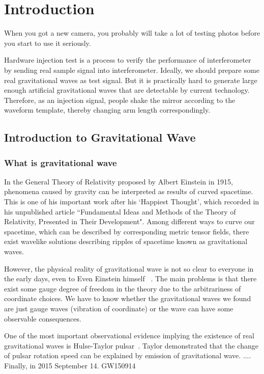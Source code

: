 \chapter{Introduction} 

When you got a new camera, you probably will take a lot of testing photos before you start to use it seriously. 

Hardware injection test is a process to verify the performance of interferometer by sending real sample signal into interferometer. Ideally, we should prepare some real gravitational waves as test signal. But it is practically hard to generate large enough artificial gravitational waves that are detectable by current technology. Therefore, as an injection signal, people shake the mirror according to the waveform template, thereby changing arm length correspondingly. 

\section{Introduction to Gravitational Wave}
\subsection{What is gravitational wave}

In the General Theory of Relativity proposed by Albert Einstein in 1915, phenomena caused by gravity can be interpreted as results of curved spacetime. This is one of his important work after his `Happiest Thought', which recorded in his unpublished article ``Fundamental Ideas and Methods of the Theory of Relativity, Presented in Their Development"\cite{Einstein:happy}. Among different ways to curve our spacetime, which can be described by corresponding metric tensor fields, there exist wavelike solutions describing ripples of spacetime known as gravitational waves.

However, the physical reality of gravitational wave is not so clear to everyone in the early days, even to Even Einstein himself ~\cite{Einstein:prl, Einstein:ongw}. The main problems is that there exist some gauge degree of freedom in the theory due to the arbitrariness of coordinate choices. We have to know whether the gravitational waves we found are just gauge waves (vibration of coordinate) or the wave can have some observable consequences. 

One of the most important observational evidence implying the existence of real gravitational waves is Hulse-Taylor pulsar~\cite{HulseTaylor:discovery}. Taylor demonstrated that the change of pulsar rotation speed can be explained by emission of gravitational wave\cite{HulseTaylor:gr}.  
....
Finally, in 2015 September 14.
GW150914


